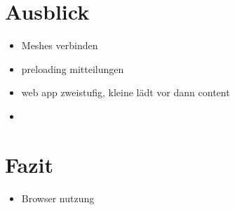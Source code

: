 \chapter{Ausblick}

\begin{itemize}
	\item Meshes verbinden
	\item preloading mitteilungen
	\item web app zweistufig, kleine lädt vor dann content
	\item 
\end{itemize}
\chapter{Fazit}\label{ch:conclusion}

\begin{itemize}
	\item Browser nutzung
\end{itemize}

%
